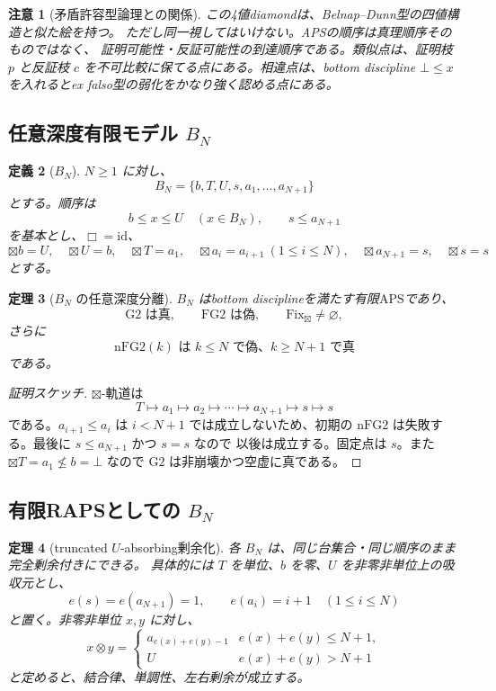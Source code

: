 \documentclass[uplatex,dvipdfmx,a4paper,10pt]{jsarticle}
\newtheorem{theorem}{定理}
\newtheorem{definition}[theorem]{定義}
\newtheorem{remark}[theorem]{注意}
\newcommand{\APS}{\mathrm{APS}}
\newcommand{\Gtwo}{\mathrm{G2}}
\newcommand{\FGtwo}{\mathrm{FG2}}
\newcommand{\nFGtwo}{\mathrm{nFG2}}
\newcommand{\Fix}{\mathrm{Fix}}
\newcommand{\bt}{\boxtimes}
\begin{document}
\begin{remark}[矛盾許容型論理との関係]
この4値diamondは、Belnap--Dunn型の四値構造と似た絵を持つ。
ただし同一視してはいけない。APSの順序は真理順序そのものではなく、
証明可能性・反証可能性の到達順序である。類似点は、証明枝 \(p\) と反証枝 \(c\)
を不可比較に保てる点にある。相違点は、bottom discipline \(\bot\le x\)
を入れるとex falso型の弱化をかなり強く認める点にある。
\end{remark}

\subsection{任意深度有限モデル \(B_N\)}

\begin{definition}[\(B_N\)]
\(N\ge1\) に対し、
\[
B_N=\{b,T,U,s,a_1,\ldots,a_{N+1}\}
\]
とする。順序は
\[
b\le x\le U\quad(x\in B_N),\qquad s\le a_{N+1}
\]
を基本とし、\(\Box=\mathrm{id}\)、
\[
\bt b=U,\quad \bt U=b,\quad \bt T=a_1,\quad
\bt a_i=a_{i+1}\ (1\le i\le N),\quad
\bt a_{N+1}=s,\quad \bt s=s
\]
とする。
\end{definition}

\begin{theorem}[\(B_N\) の任意深度分離]
\(B_N\) はbottom disciplineを満たす有限\(\APS\)であり、
\[
\Gtwo \text{ は真},\qquad \FGtwo \text{ は偽},\qquad \Fix_{\bt}\ne\varnothing,
\]
さらに
\[
\nFGtwo(k) \text{ は } k\le N \text{ で偽、} k\ge N+1 \text{ で真}
\]
である。
\end{theorem}

\begin{proof}[証明スケッチ]
\(\bt\)-軌道は
\[
T\mapsto a_1\mapsto a_2\mapsto\cdots\mapsto a_{N+1}\mapsto s\mapsto s
\]
である。\(a_{i+1}\le a_i\) は \(i<N+1\) では成立しないため、初期の
\(\nFGtwo\) は失敗する。最後に \(s\le a_{N+1}\) かつ \(s=s\) なので
以後は成立する。固定点は \(s\)。また \(\bt T=a_1\not\le b=\bot\) なので
\(\Gtwo\) は非崩壊かつ空虚に真である。
\end{proof}

\subsection{有限RAPSとしての \(B_N\)}

\begin{theorem}[truncated \(U\)-absorbing剰余化]
各 \(B_N\) は、同じ台集合・同じ順序のまま完全剰余付きにできる。
具体的には \(T\) を単位、\(b\) を零、\(U\) を非零非単位上の吸収元とし、
\[
e(s)=e(a_{N+1})=1,\qquad e(a_i)=i+1\quad(1\le i\le N)
\]
と置く。非零非単位 \(x,y\) に対し、
\[
x\otimes y=
\begin{cases}
a_{e(x)+e(y)-1} & e(x)+e(y)\le N+1,\\
U & e(x)+e(y)>N+1
\end{cases}
\]
と定めると、結合律、単調性、左右剰余が成立する。
\end{theorem}
\end{document}
